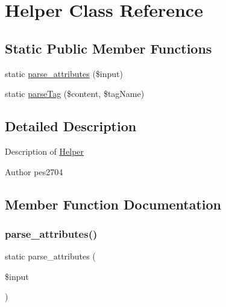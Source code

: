 \hypertarget{class_pes_1_1_dom_1_1_node_1_1_attributes_1_1_helper}{}\section{Helper Class Reference}
\label{class_pes_1_1_dom_1_1_node_1_1_attributes_1_1_helper}
\subsection*{Static Public Member Functions}
\begin{DoxyCompactItemize}
\item 
static \mbox{\hyperlink{class_pes_1_1_dom_1_1_node_1_1_attributes_1_1_helper_aca252c9ffa7a682658a1dcb401ca9862}{parse\+\_\+attributes}} (\$input)
\item 
static \mbox{\hyperlink{class_pes_1_1_dom_1_1_node_1_1_attributes_1_1_helper_ad64826d0799b8b68ae1f112a517c49d8}{parse\+Tag}} (\$content, \$tag\+Name)
\end{DoxyCompactItemize}


\subsection{Detailed Description}
Description of \mbox{\hyperlink{class_pes_1_1_dom_1_1_node_1_1_attributes_1_1_helper}{Helper}}

\begin{DoxyAuthor}{Author}
pes2704 
\end{DoxyAuthor}


\subsection{Member Function Documentation}
\mbox{\label{class_pes_1_1_dom_1_1_node_1_1_attributes_1_1_helper_aca252c9ffa7a682658a1dcb401ca9862}} 
\subsubsection{\texorpdfstring{parse\+\_\+attributes()}{parse\_attributes()}}
{\footnotesize\ttfamily static parse\+\_\+attributes (\begin{DoxyParamCaption}\item[{}]{\$input }\end{DoxyParamCaption})\hspace{0.3cm}{\ttfamily [static]}}

